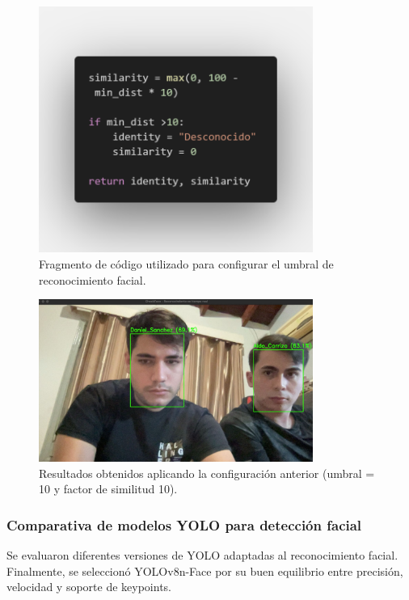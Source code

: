 \begin{figure}[H]
    \centering
    \includegraphics[width=0.8\textwidth]{capitulo_04/imagenes/6.png}
    \caption{Fragmento de código utilizado para configurar el umbral de reconocimiento facial.}
\end{figure}

\begin{figure}[H]
    \centering
    \includegraphics[width=0.8\textwidth]{capitulo_04/imagenes/6.6.jpg}
    \caption{Resultados obtenidos aplicando la configuración anterior (umbral = 10 y factor de similitud 10).}
\end{figure}






\subsubsection*{Comparativa de modelos YOLO para detección facial}

Se evaluaron diferentes versiones de YOLO adaptadas al reconocimiento facial. Finalmente, se seleccionó YOLOv8n-Face por su buen equilibrio entre precisión, velocidad y soporte de keypoints.


